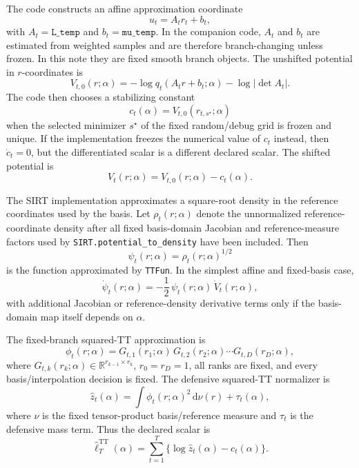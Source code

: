 \documentclass[11pt]{article}
\newcommand{\dd}{\mathrm{d}}
\newcommand{\R}{\mathbb{R}}
\newcommand{\TT}{\mathrm{TT}}
\begin{document}
The code constructs an affine approximation coordinate
\[
  u_t = A_t r_t+b_t,
  \label{eq:p11-affine}
\]
with \(A_t=\texttt{L\_temp}\) and \(b_t=\texttt{mu\_temp}\).  In the companion
code, \(A_t\) and \(b_t\) are estimated from weighted samples and are therefore
branch-changing unless frozen.  In this note they are fixed smooth branch
objects.  The unshifted potential in \(r\)-coordinates is
\[
  V_{t,0}(r;\alpha)
  =
  -\log q_t(A_t r+b_t;\alpha)-\log|\det A_t|.
  \label{eq:p11-v0}
\]
The code then chooses a stabilizing constant
\[
  c_t(\alpha)=V_{t,0}(r_{t,s^\star};\alpha)
  \label{eq:p11-const}
\]
when the selected minimizer \(s^\star\) of the fixed random/debug grid is
frozen and unique.  If the implementation freezes the numerical value of
\(c_t\) instead, then \(\dot c_t=0\), but the differentiated scalar is a
different declared scalar.  The shifted potential is
\[
  V_t(r;\alpha)=V_{t,0}(r;\alpha)-c_t(\alpha).
  \label{eq:p11-v}
\]

The SIRT implementation approximates a square-root density in the reference
coordinates used by the basis.  Let \(\rho_t(r;\alpha)\) denote the
unnormalized reference-coordinate density after all fixed basis-domain
Jacobian and reference-measure factors used by \texttt{SIRT.potential\_to\_density}
have been included.  Then
\[
  \psi_t(r;\alpha)=\rho_t(r;\alpha)^{1/2}
  \label{eq:p11-psi}
\]
is the function approximated by \texttt{TTFun}.  In the simplest affine and
fixed-basis case,
\[
  \dot\psi_t(r;\alpha)
  =
  -\frac12\,\psi_t(r;\alpha)\,\dot V_t(r;\alpha),
  \label{eq:p11-psi-derivative}
\]
with additional Jacobian or reference-density derivative terms only if the
basis-domain map itself depends on \(\alpha\).

The fixed-branch squared-TT approximation is
\[
  \phi_t(r;\alpha)
  =
  G_{t,1}(r_1;\alpha)\,
  G_{t,2}(r_2;\alpha)\cdots
  G_{t,D}(r_D;\alpha),
  \label{eq:p11-tt-function}
\]
where \(G_{t,k}(r_k;\alpha)\in\R^{r_{k-1}\times r_k}\),
\(r_0=r_D=1\), all ranks are fixed, and every basis/interpolation decision is
fixed.  The defensive squared-TT normalizer is
\[
  \widehat z_t(\alpha)
  =
  \int \phi_t(r;\alpha)^2\,\dd \nu(r)
  +
  \tau_t(\alpha),
  \label{eq:p11-z}
\]
where \(\nu\) is the fixed tensor-product basis/reference measure and
\(\tau_t\) is the defensive mass term.  Thus the declared scalar is
\[
  \widehat\ell_T^{\TT}(\alpha)
  =
  \sum_{t=1}^T
  \{\log \widehat z_t(\alpha)-c_t(\alpha)\}.
  \label{eq:p11-scalar}
\]
\end{document}

